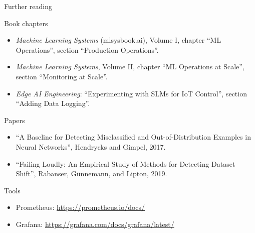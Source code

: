 \begin{frame}{Further reading}
  \footnotesize
  \begin{block}{Book chapters}
    \begin{itemize}
      \item \emph{Machine Learning Systems} (mlsysbook.ai), Volume I, chapter
            ``ML Operations'', section ``Production Operations''.
      \item \emph{Machine Learning Systems}, Volume II, chapter ``ML
            Operations at Scale'', section ``Monitoring at Scale''.
      \item \emph{Edge AI Engineering}: ``Experimenting with SLMs for IoT
            Control'', section ``Adding Data Logging''.
    \end{itemize}
  \end{block}
  \begin{block}{Papers}
    \begin{itemize}
      \item ``A Baseline for Detecting Misclassified and Out-of-Distribution
            Examples in Neural Networks'', Hendrycks and Gimpel, 2017.
      \item ``Failing Loudly: An Empirical Study of Methods for Detecting
            Dataset Shift'', Rabanser, G{\"u}nnemann, and Lipton, 2019.
    \end{itemize}
  \end{block}
  \begin{block}{Tools}
    \begin{itemize}
      \item Prometheus: \url{https://prometheus.io/docs/}
      \item Grafana: \url{https://grafana.com/docs/grafana/latest/}
    \end{itemize}
  \end{block}
\end{frame}
